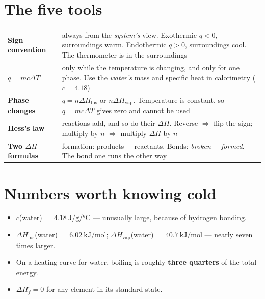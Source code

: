 \documentclass{apchem-worksheet}
\begin{document}
\apctitleblock

\section*{\sffamily The five tools}

\renewcommand{\arraystretch}{1.45}
\noindent\begin{tabular}{@{}p{3.9cm}p{9.8cm}@{}}
\toprule
\textbf{Sign convention} & always from the \emph{system's} view.
  Exothermic $q < 0$, surroundings warm. Endothermic $q > 0$, surroundings
  cool. The thermometer is in the surroundings\\
\textbf{$q = mc\Delta T$} & only while the temperature is changing, and
  only for one phase. Use the \emph{water's} mass and specific heat in
  calorimetry ($c = 4.18$)\\
\textbf{Phase changes} & $q = n\Delta H_{\text{fus}}$ or
  $n\Delta H_{\text{vap}}$. Temperature is constant, so $q = mc\Delta T$
  gives zero and cannot be used\\
\textbf{Hess's law} & reactions add, and so do their $\Delta H$. Reverse
  $\Rightarrow$ flip the sign; multiply by $n$ $\Rightarrow$ multiply
  $\Delta H$ by $n$\\
\textbf{Two $\Delta H$ formulas} & formation: products $-$ reactants.
  Bonds: \emph{broken} $-$ \emph{formed}. The bond one runs the other way\\
\bottomrule
\end{tabular}

\section*{\sffamily Numbers worth knowing cold}

\begin{itemize}[leftmargin=*,itemsep=0.18em]
  \item $c$(water) $= \SI{4.18}{\joule\per\gram\per\celsius}$ --- unusually
        large, because of hydrogen bonding.
  \item $\Delta H_{\text{fus}}$(water) $=
        \SI{6.02}{\kilo\joule\per\mole}$;
        $\Delta H_{\text{vap}}$(water) $=
        \SI{40.7}{\kilo\joule\per\mole}$ --- nearly seven times larger.
  \item On a heating curve for water, boiling is roughly \textbf{three
        quarters} of the total energy.
  \item $\Delta H_f^\circ = 0$ for any element in its standard state.
\end{itemize}
\end{document}
